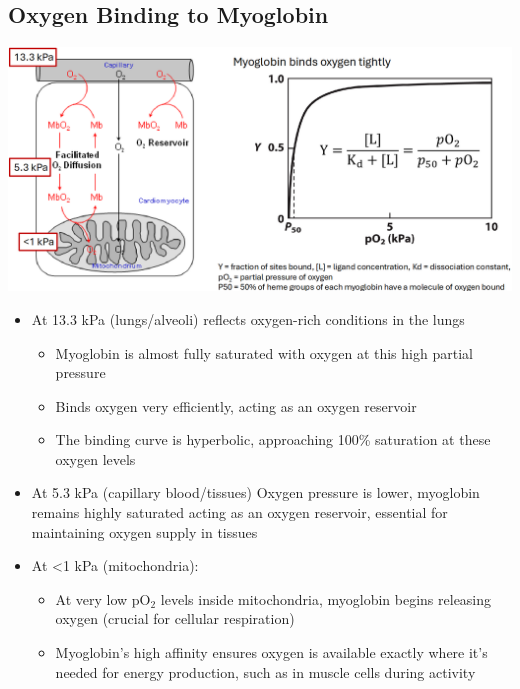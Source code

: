 \documentclass[10pt]{article}
\begin{document}
\subsection*{Oxygen Binding to Myoglobin}
\begin{center}
    \includegraphics*[width=\textwidth]{L2_11.png}
\end{center}
\begin{itemize}
    \item At 13.3 kPa (lungs/alveoli) reflects oxygen-rich conditions in the lungs
    \begin{itemize}
        \item Myoglobin is almost fully saturated with oxygen at this high partial pressure
        \item Binds oxygen very efficiently, acting as an oxygen reservoir
        \item The binding curve is hyperbolic, approaching 100\% saturation at these oxygen levels
    \end{itemize}
    \item At 5.3 kPa (capillary blood/tissues) Oxygen pressure is lower, myoglobin remains highly saturated acting as an oxygen reservoir, essential for maintaining oxygen supply in tissues
    \item At <1 kPa (mitochondria):
    \begin{itemize}
        \item At very low pO$_2$ levels inside mitochondria, myoglobin begins releasing oxygen (crucial for cellular respiration)
        \item Myoglobin's high affinity ensures oxygen is available exactly where it's needed for energy production, such as in muscle cells during activity
    \end{itemize}
\end{itemize}
\end{document}
